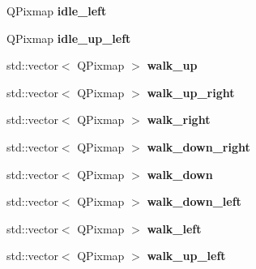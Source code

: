 \begin{DoxyCompactItemize}
\item 
\hypertarget{class_default_unit_ad0257ef2bb652931aa303876f1fd6cff}{}Q\+Pixmap {\bfseries idle\+\_\+left}\label{class_default_unit_ad0257ef2bb652931aa303876f1fd6cff}

\item 
\hypertarget{class_default_unit_a9a81917c903e4bb92be9266fc8abc277}{}Q\+Pixmap {\bfseries idle\+\_\+up\+\_\+left}\label{class_default_unit_a9a81917c903e4bb92be9266fc8abc277}

\item 
\hypertarget{class_default_unit_a151aafd4a3c5471d55028b0b111238c2}{}std\+::vector$<$ Q\+Pixmap $>$ {\bfseries walk\+\_\+up}\label{class_default_unit_a151aafd4a3c5471d55028b0b111238c2}

\item 
\hypertarget{class_default_unit_a043241543d5bf6037e7ecf416675f490}{}std\+::vector$<$ Q\+Pixmap $>$ {\bfseries walk\+\_\+up\+\_\+right}\label{class_default_unit_a043241543d5bf6037e7ecf416675f490}

\item 
\hypertarget{class_default_unit_ae56425abc1752e11849d2cd9086b9c82}{}std\+::vector$<$ Q\+Pixmap $>$ {\bfseries walk\+\_\+right}\label{class_default_unit_ae56425abc1752e11849d2cd9086b9c82}

\item 
\hypertarget{class_default_unit_afe21ab2ca0036b3b91370c296b18b8ff}{}std\+::vector$<$ Q\+Pixmap $>$ {\bfseries walk\+\_\+down\+\_\+right}\label{class_default_unit_afe21ab2ca0036b3b91370c296b18b8ff}

\item 
\hypertarget{class_default_unit_a475828bb5c2495a7f34a5e3bc21f451b}{}std\+::vector$<$ Q\+Pixmap $>$ {\bfseries walk\+\_\+down}\label{class_default_unit_a475828bb5c2495a7f34a5e3bc21f451b}

\item 
\hypertarget{class_default_unit_a9fbee9da7730b30b08d45c09c01263a0}{}std\+::vector$<$ Q\+Pixmap $>$ {\bfseries walk\+\_\+down\+\_\+left}\label{class_default_unit_a9fbee9da7730b30b08d45c09c01263a0}

\item 
\hypertarget{class_default_unit_a6ef03e1d26b91ba36e23e835e3d26bbe}{}std\+::vector$<$ Q\+Pixmap $>$ {\bfseries walk\+\_\+left}\label{class_default_unit_a6ef03e1d26b91ba36e23e835e3d26bbe}

\item 
\hypertarget{class_default_unit_a302d819982b9e78acd7bb47134b8fb3b}{}std\+::vector$<$ Q\+Pixmap $>$ {\bfseries walk\+\_\+up\+\_\+left}\label{class_default_unit_a302d819982b9e78acd7bb47134b8fb3b}


\end{DoxyCompactItemize}
